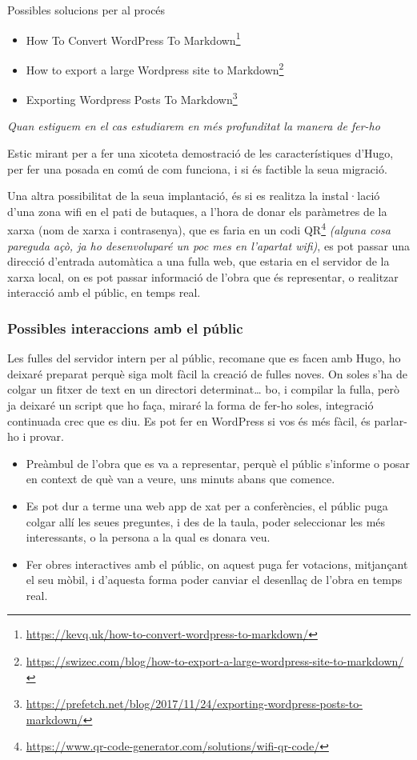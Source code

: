 \documentclass[
  10pt,
]{krantz}
\DeclareRobustCommand{\href}[2]{#2\footnote{\url{#1}}}
\providecommand{\tightlist}{%
  \setlength{\itemsep}{0pt}\setlength{\parskip}{0pt}}
\begin{document}
Possibles solucions per al procés

\begin{itemize}
\tightlist
\item
  \href{https://kevq.uk/how-to-convert-wordpress-to-markdown/}{How To Convert WordPress To Markdown}
\item
  \href{https://swizec.com/blog/how-to-export-a-large-wordpress-site-to-markdown/}{How to export a large Wordpress site to Markdown}
\item
  \href{https://prefetch.net/blog/2017/11/24/exporting-wordpress-posts-to-markdown/}{Exporting Wordpress Posts To Markdown}
\end{itemize}

\emph{Quan estiguem en el cas estudiarem en més profunditat la manera de fer-ho}

Estic mirant per a fer una xicoteta demostració de les característiques d'Hugo, per fer una posada en comú de com funciona, i si és factible la seua migració.

Una altra possibilitat de la seua implantació, és si es realitza la instal·lació d'una zona wifi en el pati de butaques, a l'hora de donar els paràmetres de la xarxa (nom de xarxa i contrasenya), que es faria en un codi \href{https://www.qr-code-generator.com/solutions/wifi-qr-code/}{QR} \emph{(alguna cosa pareguda açò, ja ho desenvoluparé un poc mes en l'apartat wifi)}, es pot passar una direcció d'entrada automàtica a una fulla web, que estaria en el servidor de la xarxa local, on es pot passar informació de l'obra que és representar, o realitzar interacció amb el públic, en temps real.

\hypertarget{possibles-interaccions-amb-el-puxfablic}{%
\subsubsection{Possibles interaccions amb el públic}\label{possibles-interaccions-amb-el-puxfablic}}

Les fulles del servidor intern per al públic, recomane que es facen amb Hugo, ho deixaré preparat perquè siga molt fàcil la creació de fulles noves. On soles s'ha de colgar un fitxer de text en un directori determinat\ldots{} bo, i compilar la fulla, però ja deixaré un script que ho faça, miraré la forma de fer-ho soles, integració continuada crec que es diu. Es pot fer en WordPress si vos és més fàcil, és parlar-ho i provar.

\begin{itemize}
\item
  Preàmbul de l'obra que es va a representar, perquè el públic s'informe o posar en context de què van a veure, uns minuts abans que comence.
\item
  Es pot dur a terme una web app de xat per a conferències, el públic puga colgar allí les seues preguntes, i des de la taula, poder seleccionar les més interessants, o la persona a la qual es donara veu.
\item
  Fer obres interactives amb el públic, on aquest puga fer votacions, mitjançant el seu mòbil, i d'aquesta forma poder canviar el desenllaç de l'obra en temps real.
\end{itemize}
\end{document}
